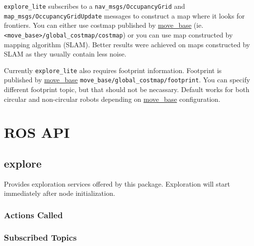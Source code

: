\texttt{explore\_lite} subscribes to a \texttt{nav\_msgs/Occu\-pan\-cy\-Grid} and \texttt{map\_msgs/Occu\-pan\-cy\-Grid\-Up\-da\-te} messages to construct a map where it looks for frontiers. You can either use costmap published by \href{http://wiki.ros.org/move_base}{move\_base} (ie. \texttt{<mo\-ve\_ba\-se>/glo\-bal\_cost\-map/\-cost\-map}) or you can use map constructed by mapping algorithm (SLAM). Better results were achieved on maps constructed by SLAM as they usually contain less noise.

Currently \texttt{explore\_lite} also requires footprint information. Footprint is published by \href{http://wiki.ros.org/move_base}{move\_base} \texttt{move\_base/global\_costmap/footprint}. You can specify different footprint topic, but that should not be necassary. Default works for both circular and non-circular robots depending on \href{http://wiki.ros.org/move_base}{move\_base} configuration.

\section{ROS API}
\subsection{explore}

Provides exploration services offered by this package. Exploration will start immediately after node initialization.

\subsubsection{Actions Called}

\subsubsection{Subscribed Topics}

